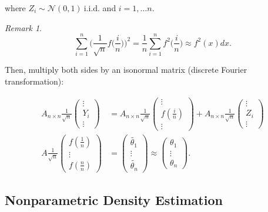 \documentclass[twoside]{article}
\theoremstyle{definition}
\theoremstyle{definition}
\theoremstyle{remark}
\newtheorem*{rem}{Remark}
\def\Y{{\mathcal Y}}
\begin{document}
where $Z_i \sim \mathcal{N}(0,1) \ \text{i.i.d.}$ and $i=1, \ldots n$.

\begin{rem}
\[
\sum \limits_{i=1}^n \bigg( \frac{1}{\sqrt{n}} f \bigg( \frac{i}{n} \bigg) \bigg)^2 = \frac{1}{n} \sum \limits_{i=1}^n f^2 \bigg( \frac{i}{n} \bigg) \approx f^2(x)dx.
\]

Then, multiply both sides by an isonormal matrix (discrete Fourier transformation):

\[
\begin{aligned}
A_{n\times n} \frac{1}{\sqrt{n}} \left(\begin{smallmatrix} \vdots \\Y_i \\ \vdots \end{smallmatrix}\right) &= A_{n\times n} \frac{1}{\sqrt{n}} \left(\begin{smallmatrix} \vdots \\ f(\frac{i}{n}) \\ \vdots \end{smallmatrix}\right) + A_{n\times n} \frac{1}{\sqrt{n}} \left(\begin{smallmatrix} \vdots \\Z_i \\ \vdots \end{smallmatrix}\right) \\
A \frac{1}{\sqrt{n}} \left(\begin{smallmatrix} f(\frac{1}{n}) \\ \vdots \\ f(\frac{n}{n}) \end{smallmatrix}\right) &= \left(\begin{smallmatrix} \widetilde{\theta_1} \\ \vdots \\ \widetilde{\theta_n} \end{smallmatrix}\right) \approx \left(\begin{smallmatrix} \theta_1 \\ \vdots \\ \theta_n \end{smallmatrix}\right).
\end{aligned}
\]
\end{rem}

\subsection{Nonparametric Density Estimation}
\end{document}
